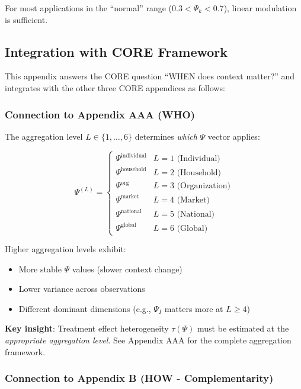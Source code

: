 For most applications in the ``normal'' range ($0.3 < \Psi_k < 0.7$), 
linear modulation is sufficient.



\subsection{Integration with CORE Framework}
\label{sec:V-core-integration}

This appendix answers the CORE question ``WHEN does context matter?'' and 
integrates with the other three CORE appendices as follows:

\subsubsection{Connection to Appendix AAA (WHO)}

The aggregation level $L \in \{1, \ldots, 6\}$ determines \textit{which} $\Psi$ 
vector applies:

\begin{equation}
\Psi^{(L)} = \begin{cases}
\Psi^{\text{individual}} & L = 1 \text{ (Individual)} \\
\Psi^{\text{household}} & L = 2 \text{ (Household)} \\
\Psi^{\text{org}} & L = 3 \text{ (Organization)} \\
\Psi^{\text{market}} & L = 4 \text{ (Market)} \\
\Psi^{\text{national}} & L = 5 \text{ (National)} \\
\Psi^{\text{global}} & L = 6 \text{ (Global)}
\end{cases}
\end{equation}

Higher aggregation levels exhibit:
\begin{itemize}
    \item More stable $\Psi$ values (slower context change)
    \item Lower variance across observations
    \item Different dominant dimensions (e.g., $\Psi_I$ matters more at $L \geq 4$)
\end{itemize}

\textbf{Key insight}: Treatment effect heterogeneity $\tau(\Psi)$ must be estimated 
at the \textit{appropriate aggregation level}. See Appendix AAA for the complete 
aggregation framework.

\subsubsection{Connection to Appendix B (HOW - Complementarity)}

